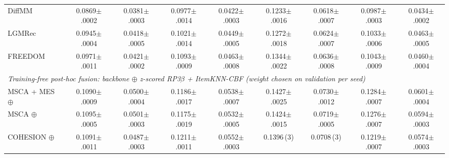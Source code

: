 \begin{table}[t]
\begin{tabular}{lcccccccc}
DiffMM~\cite{jiang2024diffmm} & 0.0869{\scriptsize$\pm$.0002}\rlap{$^{\blacktriangledown}$} & 0.0381{\scriptsize$\pm$.0003}\rlap{$^{\blacktriangledown}$} & 0.0977{\scriptsize$\pm$.0014}\rlap{$^{\blacktriangledown}$} & 0.0422{\scriptsize$\pm$.0003}\rlap{$^{\blacktriangledown}$} & 0.1233{\scriptsize$\pm$.0016}\rlap{$^{\blacktriangledown}$} & 0.0618{\scriptsize$\pm$.0007}\rlap{$^{\blacktriangledown}$} & 0.0987{\scriptsize$\pm$.0003}\rlap{$^{\blacktriangledown}$} & 0.0434{\scriptsize$\pm$.0002}\rlap{$^{\blacktriangledown}$} \\
LGMRec~\cite{guo2023lgmrec} & 0.0945{\scriptsize$\pm$.0004}\rlap{$^{\blacktriangledown}$} & 0.0418{\scriptsize$\pm$.0005}\rlap{$^{\blacktriangledown}$} & 0.1021{\scriptsize$\pm$.0014}\rlap{$^{\blacktriangledown}$} & 0.0449{\scriptsize$\pm$.0005}\rlap{$^{\blacktriangledown}$} & 0.1272{\scriptsize$\pm$.0018}\rlap{$^{\blacktriangledown}$} & 0.0624{\scriptsize$\pm$.0007}\rlap{$^{\blacktriangledown}$} & 0.1033{\scriptsize$\pm$.0006}\rlap{$^{\blacktriangledown}$} & 0.0463{\scriptsize$\pm$.0005}\rlap{$^{\blacktriangledown}$} \\
FREEDOM~\cite{zhou2023freedom} & 0.0971{\scriptsize$\pm$.0011}\rlap{$^{\blacktriangledown}$} & 0.0421{\scriptsize$\pm$.0002}\rlap{$^{\blacktriangledown}$} & 0.1093{\scriptsize$\pm$.0009}\rlap{$^{\blacktriangledown}$} & 0.0463{\scriptsize$\pm$.0008}\rlap{$^{\blacktriangledown}$} & 0.1344{\scriptsize$\pm$.0022}\rlap{$^{\blacktriangledown}$} & 0.0636{\scriptsize$\pm$.0008}\rlap{$^{\blacktriangledown}$} & 0.1043{\scriptsize$\pm$.0009}\rlap{$^{\blacktriangledown}$} & 0.0460{\scriptsize$\pm$.0004}\rlap{$^{\blacktriangledown}$} \\
\midrule
\multicolumn{9}{l}{\textit{Training-free post-hoc fusion: backbone $\oplus$ z-scored RP3$\beta$ + ItemKNN-CBF (weight chosen on validation per seed)}}\\
MSCA + MES $\oplus$ & 0.1090{\scriptsize$\pm$.0009} & 0.0500{\scriptsize$\pm$.0004} & 0.1186{\scriptsize$\pm$.0017} & 0.0538{\scriptsize$\pm$.0007} & 0.1427{\scriptsize$\pm$.0025} & 0.0730{\scriptsize$\pm$.0012} & 0.1284{\scriptsize$\pm$.0007} & 0.0601{\scriptsize$\pm$.0004} \\
MSCA $\oplus$ & 0.1095{\scriptsize$\pm$.0005} & 0.0501{\scriptsize$\pm$.0003} & 0.1175{\scriptsize$\pm$.0019} & 0.0532{\scriptsize$\pm$.0005} & 0.1424{\scriptsize$\pm$.0015} & 0.0719{\scriptsize$\pm$.0005} & 0.1276{\scriptsize$\pm$.0007} & 0.0594{\scriptsize$\pm$.0003} \\
COHESION $\oplus$ & 0.1091{\scriptsize$\pm$.0011} & 0.0487{\scriptsize$\pm$.0003} & 0.1211{\scriptsize$\pm$.0011} & 0.0552{\scriptsize$\pm$.0003} & 0.1396\,(3) & 0.0708\,(3) & 0.1219{\scriptsize$\pm$.0007} & 0.0574{\scriptsize$\pm$.0003} \\

\end{tabular}
\end{table}
